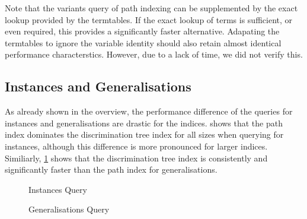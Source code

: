 Note that the variants query of path indexing can be supplemented by the exact lookup provided by the termtables. If the exact lookup of terms is sufficient, or even required, this provides a significantly faster alternative. Adapating the termtables to ignore the variable identity should also retain almost identical performance characterstics. However, due to a lack of time, we did not verify this.

\subsection{Instances and Generalisations}
As already shown in the overview, the performance difference of the queries for instances and generalisations are drastic for the indices.  shows that the path index dominates the discrimination tree index for all sizes when querying for instances, although this difference is more pronounced for larger indices. Similiarly, \cref{gener} shows that the discrimination tree index is consistently and significantly faster than the path index for generalisations.

\begin{figure}[h]
  \begin{minipage}{0.45\textwidth}
\begin{adjustbox}{width=1\textwidth}
\end{adjustbox}
\caption{Instances Query}
\label{inst}
\end{minipage}
\begin{minipage}{0.1\textwidth}
\end{minipage}
\begin{minipage}{0.45\textwidth}
\begin{adjustbox}{width=1\textwidth}
\end{adjustbox}
\caption{Generalisations Query}
\label{gener}
\end{minipage}
\end{figure}

